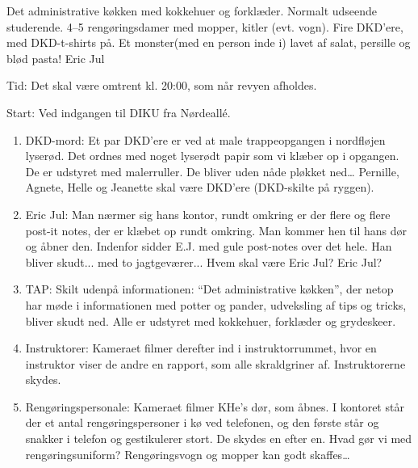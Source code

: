 \documentclass[10pt]{article}
\begin{document}

\begin{roles}
 Det administrative køkken med kokkehuer og forklæder.
 Normalt udseende studerende.
 4--5 rengøringsdamer med mopper, kitler (evt. vogn).
 Fire DKD'ere, med DKD-t-shirts på.
 Et monster(med en person inde i) lavet af salat, persille og blød pasta!
 Eric Jul
~
\end{roles}

\begin{sketch}
Tid: Det skal være omtrent kl. 20:00, som når revyen afholdes.

Start: Ved indgangen til {\sc DIKU} fra Nørdeall\'e.

\begin{enumerate}

\item DKD-mord: Et par DKD'ere er ved at male trappeopgangen i nordfløjen
  lyserød. Det ordnes med noget lyserødt papir som vi klæber op i opgangen.
  De er udstyret med malerruller. De bliver uden nåde pløkket ned\ldots
  Pernille, Agnete, Helle og Jeanette skal være DKD'ere (DKD-skilte på
  ryggen).

\item Eric Jul: Man nærmer sig hans kontor, rundt omkring er der flere og
  flere post-it notes, der er klæbet op rundt omkring. Man kommer hen til
  hans dør og åbner den. Indenfor sidder E.J. med gule post-notes over det
  hele. Han bliver skudt... med to jagtgeværer... Hvem skal være Eric Jul?
  Eric Jul?

\item TAP: Skilt udenpå informationen: ``Det administrative køkken'', der
  netop har møde i informationen med potter og pander, udveksling af tips
  og tricks, bliver skudt ned. Alle er udstyret med kokkehuer, forklæder og
  grydeskeer.

\item Instruktorer: Kameraet filmer derefter ind i instruktorrummet,
  hvor en instruktor viser de andre en rapport, som alle skraldgriner
  af. Instruktorerne skydes.

\item Rengøringspersonale: Kameraet filmer KHe's dør, som åbnes.
  I kontoret står der et antal rengøringspersoner i kø ved telefonen,
  og den første står og snakker i telefon og gestikulerer stort. De
  skydes en efter en. Hvad gør vi med rengøringsuniform? Rengøringsvogn og
  mopper kan godt skaffes\ldots


\end{enumerate}
\end{sketch}
\end{document}
